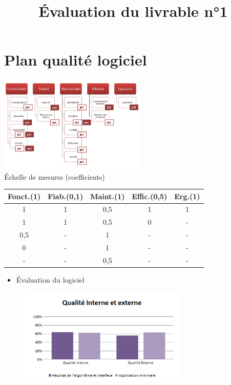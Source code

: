 \documentclass[xcolor=dvipsnames]{beamer}
\begin{document}
\section{Plan qualit\'e logiciel}
	\begin{frame}{\secname}
		\title{\'Evaluation du livrable n°1}
		\begin{center}	
			\includegraphics[width=7cm]{iso9126}
			\\\'Echelle de mesures (coefficients)\\
			\smallskip
			\footnotesize
			\begin{tabular}{|c|c|c|c|c|}
				\hline
				Fonct.(1) & Fiab.(0,1) & Maint.(1) & Effic.(0,5) & Erg.(1)\\
				\hline
				\hline
				1 & 1 & 0,5 & 1 & 1\\
				\hline
				1 & 1 & 0,5 & 0 & - \\
				\hline
				0,5 & - & 1 & - & -\\
				\hline
				0 & - & 1 & - & - \\
				\hline
				- & - & 0,5 & - & - \\
				\hline
			\end{tabular}	
		\end{center}
	\end{frame}


	\begin{frame}{\secname}
		\begin{itemize}
			\item \'Evaluation du logiciel 
		\end{itemize}
		\begin{figure}
			\includegraphics[width=8cm]{Images/QualiteInterneExterne.png} %
		\end{figure}
	\end{frame}
\end{document}
